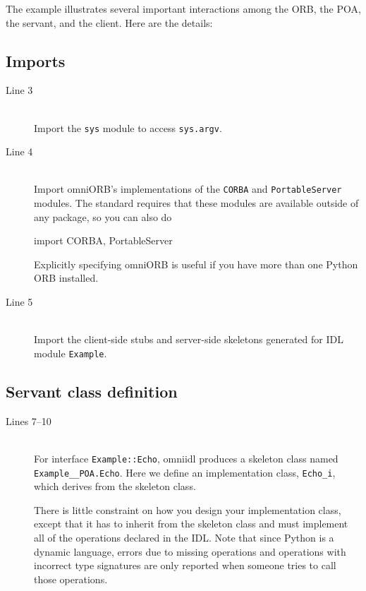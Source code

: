 \documentclass[draft,11pt,twoside,a4paper]{book}
\newcommand{\type}[1]{\texttt{#1}}
\newcommand{\intf}[1]{\texttt{#1}}
\newcommand{\module}[1]{\texttt{#1}}
\newcommand{\code}[1]{\texttt{#1}}
\begin{document}
The example illustrates several important interactions among the ORB,
the POA, the servant, and the client. Here are the details:

\subsection{Imports}

\begin{description}

\item[Line 3]\mbox{}\\
%
Import the \module{sys} module to access \code{sys.argv}.

\item[Line 4]\mbox{}\\
%
Import omniORB's implementations of the \module{CORBA} and
\module{PortableServer} modules. The standard requires that these
modules are available outside of any package, so you can also do

\begin{pylisting}
import CORBA, PortableServer
\end{pylisting}

\noindent Explicitly specifying omniORB is useful if you have more
than one Python ORB installed.

\item[Line 5]\mbox{}\\
%
Import the client-side stubs and server-side skeletons generated for
IDL module \module{Example}.

\end{description}


\subsection{Servant class definition}

\begin{description}

\item[Lines 7--10]\mbox{}\\
%
For interface \intf{Example::Echo}, omniidl produces a skeleton class
named \type{Example\_\_POA.Echo}. Here we define an implementation
class, \type{Echo\_i}, which derives from the skeleton class.

There is little constraint on how you design your implementation
class, except that it has to inherit from the skeleton class and must
implement all of the operations declared in the IDL. Note that since
Python is a dynamic language, errors due to missing operations and
operations with incorrect type signatures are only reported when
someone tries to call those operations.

\end{description}
\end{document}
